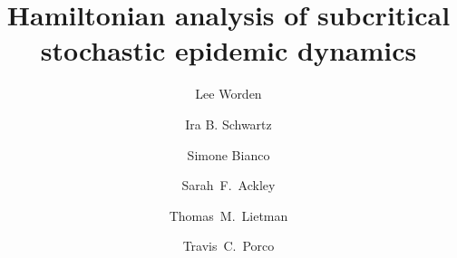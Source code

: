 \documentclass[review]{elsarticle}
\begin{document}
\begin{frontmatter}

\title{Hamiltonian analysis of subcritical stochastic epidemic dynamics}

\author[proctor]{Lee Worden}

\author[nrl]{Ira B. Schwartz}

\author[ibm]{Simone Bianco}

\author[proctor,biostat]{Sarah~F.~Ackley}

\author[proctor,ophth]{Thomas~M.~Lietman}

\author[proctor,ophth,biostat]{Travis~C.~Porco}

\address[proctor]{Francis I. Proctor Foundation, University of California San Francisco, San Francisco, California, USA}
\address[nrl]{Nonlinear Systems Dynamics Section, Plasma Physics Division, U.S. Naval Research Laboratory, Washington, DC, USA}
\address[ibm]{Department of Industrial and Applied Genomics, IBM Accelerated Discovery Lab, IBM Almaden Research Center, 650 Harry Rd, San Jose, CA 95120-6099, USA}
\address[biostat]{Department of Epidemiology and Biostatistics, University of California San Francisco, San Francisco, California, USA}
\address[ophth]{Department of Epidemiology and Biostatistics, University of California, San Francisco, California, USA}


\end{frontmatter}
\end{document}
